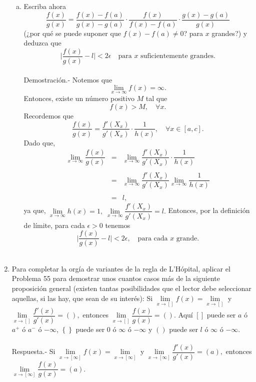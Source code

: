 \begin{enumerate}[\bfseries 1.]
\begin{enumerate}[(a)]
	    \item Escriba ahora
	    $$\dfrac{f(x)}{g(x)}=\dfrac{f(x)-f(a)}{g(x)-g(a)}\cdot \dfrac{f(x)}{f(x)-f(a)}\cdot \dfrac{g(x)-g(a)}{g(x)}$$
	    (¿por qué se puede suponer que $f(x)-f(a)\neq 0$? para $x$ grandes?) y deduzca que
	    $$\bigg|\dfrac{f(x)}{g(x)}-l\bigg|<2\epsilon\quad \mbox{para }x \mbox{ suficientemente grandes}.$$\\
		Demostración.-\; Notemos que
		$$\lim_{x\to \infty}f(x)=\infty.$$
		Entonces, existe un número positivo $M$ tal que
		$$f(x)>M,\quad \forall x.$$
		Recordemos que
		$$\dfrac{f(x)}{g(x)}=\dfrac{f'(X_x)}{g'(X_x)}\cdot \dfrac{1}{h(x)},\quad \forall x\in [a,c].$$
		Dado que,
		$$
		\begin{array}{rcl}
		    \lim\limits_{x\to \infty}\dfrac{f(x)}{g(x)} &=& \lim\limits_{x\to \infty} \dfrac{f'(X_x)}{g'(X_x)}\cdot \dfrac{1}{h(x)}\\\\
								&=&\lim\limits_{x\to \infty} \dfrac{f'(X_x)}{g'(X_x)}\lim\limits_{x\to \infty} \dfrac{1}{h(x)}\\\\
								&=& l,
		\end{array}
		$$
		ya que, $\lim\limits_{x\to \infty}h(x)=1,\; \lim\limits_{x\to \infty}\dfrac{f'(X_x)}{g'(X_x)}=l.$
		Entonces, por la definición de límite, para cada $\epsilon>0$ tenemos
		$$\Bigg|\dfrac{f(x)}{g(x)}-l\Bigg|<2\epsilon,\quad \mbox{para cada }x \mbox{ grande}.$$\\

	\end{enumerate}

    \item Para completar la orgía de variantes de la regla de L’Hópital, aplicar el Problema 55 para demostrar unos cuantos casos más de la siguiente proposición general (existen tantas posibilidades que el lector debe seleccionar aquellas, si las hay, que sean de su interés):
    Si $\lim\limits_{x\to []}f(x)=\lim\limits_{x\to []}$ y $\lim\limits_{x\to []} \dfrac{f'(x)}{g'(x)}=(),$ entonces $\lim\limits_{x\to []} \dfrac{f(x)}{g(x)}=().$ Aquí $\left[\right]$ puede ser $a$ ó $a^+$ ó $a^-$ ó $-\infty$, $\left\{\right\}$ puede ser $0$ ó $\infty$ ó $-\infty$ y $()$ puede ser $l$ ó $\infty$ ó $-\infty$.\\\\
	Respuesta.-\; Si $\lim\limits_{x\to [\infty]}f(x)=\lim\limits_{x\to [\infty]}$ y $\lim\limits_{x\to [\infty]} \dfrac{f'(x)}{g'(x)}=(a),$ entonces $\lim\limits_{x\to [\infty]} \dfrac{f(x)}{g(x)}=(a).$\\\\


\end{enumerate}
